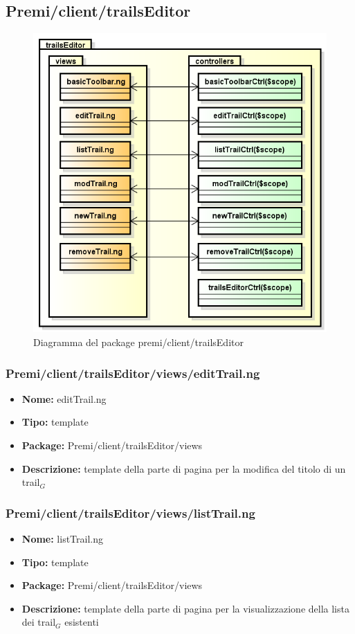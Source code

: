 \subsection{Premi/client/trailsEditor}
\begin{figure}[!h]
\begin{center}
\includegraphics[scale=0.45]{img/diapkg/trailsEditor.png}
\caption{Diagramma del package premi/client/trailsEditor}
\end{center}
\end{figure}
\subsubsection{Premi/client/trailsEditor/views/editTrail.ng}
\begin{itemize}
  \item[] \textbf{Nome:} editTrail.ng
  \item[] \textbf{Tipo:} template
  \item[] \textbf{Package:} Premi/client/trailsEditor/views
  \item[] \textbf{Descrizione:}  template della parte di pagina per la modifica del titolo di un trail$_G$
\end{itemize}
\subsubsection{Premi/client/trailsEditor/views/listTrail.ng}
\begin{itemize}
  \item[] \textbf{Nome:} listTrail.ng
  \item[] \textbf{Tipo:} template
  \item[] \textbf{Package:} Premi/client/trailsEditor/views
  \item[] \textbf{Descrizione:}  template della parte di pagina per la visualizzazione della lista dei trail$_G$ esistenti
\end{itemize}
